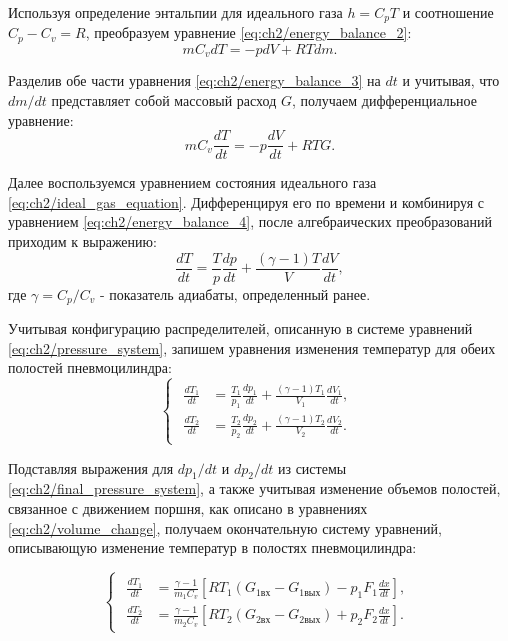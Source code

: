 Используя определение энтальпии для идеального газа $h = C_pT$ и соотношение $C_p - C_v = R$, преобразуем уравнение \eqref{eq:ch2/energy_balance_2}:
\begin{equation}
\label{eq:ch2/energy_balance_3}
    mC_vdT = -pdV + RTdm.
\end{equation}

Разделив обе части уравнения \eqref{eq:ch2/energy_balance_3} на $dt$ и учитывая, что $dm/dt$ представляет собой массовый расход $G$, получаем дифференциальное уравнение:
\begin{equation}
\label{eq:ch2/energy_balance_4}
    mC_v\frac{dT}{dt} = -p\frac{dV}{dt} + RTG.
\end{equation}

Далее воспользуемся уравнением состояния идеального газа \eqref{eq:ch2/ideal_gas_equation}. Дифференцируя его по времени и комбинируя с уравнением \eqref{eq:ch2/energy_balance_4}, после алгебраических преобразований приходим к выражению:
\begin{equation}
\label{eq:ch2/energy_balance_5}
    \frac{dT}{dt} = \frac{T}{p}\frac{dp}{dt} + \frac{(\gamma-1)T}{V}\frac{dV}{dt},
\end{equation}
где $\gamma = C_p/C_v$ - показатель адиабаты, определенный ранее.

Учитывая конфигурацию распределителей, описанную в системе уравнений \eqref{eq:ch2/pressure_system}, запишем уравнения изменения температур для обеих полостей пневмоцилиндра:
\begin{equation}
\label{eq:ch2/energy_balance_6}
    \begin{cases}
        \begin{aligned}
            \frac{dT_1}{dt} & = \frac{T_1}{p_1}\frac{dp_1}{dt} + \frac{(\gamma-1)T_1}{V_1}\frac{dV_1}{dt}, \\
            \frac{dT_2}{dt} & = \frac{T_2}{p_2}\frac{dp_2}{dt} + \frac{(\gamma-1)T_2}{V_2}\frac{dV_2}{dt}.
        \end{aligned}
    \end{cases}
\end{equation}

Подставляя выражения для $dp_1/dt$ и $dp_2/dt$ из системы \eqref{eq:ch2/final_pressure_system}, а также учитывая изменение объемов полостей,
связанное с движением поршня, как описано в уравнениях \eqref{eq:ch2/volume_change}, получаем окончательную
систему уравнений, описывающую изменение температур в полостях пневмоцилиндра:

\begin{equation}
\label{eq:ch2/energy_balance_final}
    \begin{cases}
        \begin{aligned}
            \frac{dT_1}{dt} & = \frac{\gamma-1}{m_1C_v}\left[RT_1(G_{1\text{вх}} - G_{1\text{вых}}) - p_1F_1\frac{dx}{dt}\right], \\
            \frac{dT_2}{dt} & = \frac{\gamma-1}{m_2C_v}\left[RT_2(G_{2\text{вх}} - G_{2\text{вых}}) + p_2F_2\frac{dx}{dt}\right].
        \end{aligned}
    \end{cases}
\end{equation}

